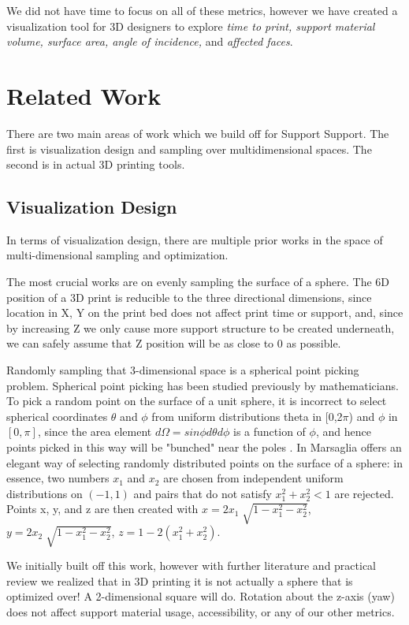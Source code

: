 \documentclass{sigchi}
\begin{document}
We did not have time to focus on all of these metrics, however we have created a visualization tool for 3D designers to explore \emph{time to print, support material volume, surface area, angle of incidence,} and \emph{affected faces}.

\section{Related Work}
There are two main areas of work which we build off for Support Support.  The first is visualization design and sampling over multidimensional spaces.  The second is in actual 3D printing tools.

\subsection{Visualization Design}
In terms of visualization design, there are multiple prior works in the space of multi-dimensional sampling and optimization.

The most crucial works are on evenly sampling the surface of a sphere.  The 6D position of a 3D print is reducible to the three directional dimensions, since location in X, Y on the print bed does not affect print time or support, and, since by increasing Z we only cause more support structure to be created underneath, we can safely assume that Z position will be as close to 0 as possible.

Randomly sampling that 3-dimensional space is a spherical point picking problem.  Spherical point picking has been studied previously by mathematicians.  To pick a random point on the surface of a unit sphere, it is incorrect to select spherical coordinates $\theta$ and $\phi$ from uniform distributions theta in [0,2$\pi$) and $\phi$ in $[0,\pi]$, since the area element $d\Omega=sin\phi d\theta d\phi$ is a function of $\phi$, and hence points picked in this way will be "bunched" near the poles \cite{wolfram}.  In \cite{sphere-point} Marsaglia offers an elegant way of selecting randomly distributed points on the surface of a sphere: in essence, two numbers $x_1$ and $x_2$ are chosen from independent uniform distributions on $(-1, 1)$ and pairs that do not satisfy $x_1^2 + x_2^2 < 1$ are rejected.  Points x, y, and z are then created with $x = 2x_1\sqrt[]{1-x_1^2-x_2^2}$, $y = 2x_2\sqrt[]{1-x_1^2-x_2^2}$, $z = 1 - 2(x_1^2 + x_2^2)$.

We initially built off this work, however with further literature and practical review we realized that in 3D printing it is not actually a sphere that is optimized over!  A 2-dimensional square will do.  Rotation about the z-axis (yaw) does not affect support material usage, accessibility, or any of our other metrics.
\end{document}
